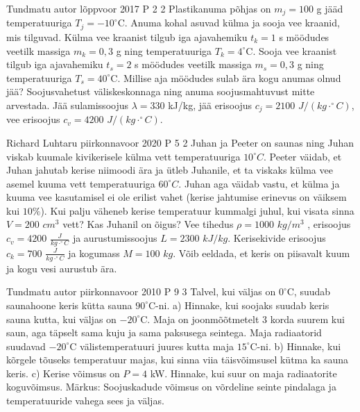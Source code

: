 \documentclass[11pt]{article}
\begin{document}
{%
{Tundmatu autor} %
{lõppvoor} %
{2017} %
{P 2} %
{2} %
{
\ifStatement
Plastikanuma põhjas on $m_j = 100$ g jääd temperatuuriga $T_j = -10 ^{\circ}$C. Anuma kohal asuvad külma ja sooja vee kraanid, mis tilguvad. Külma vee kraanist tilgub iga ajavahemiku $t_k = 1$ s möödudes veetilk massiga $m_k = 0,3$ g ning temperatuuriga $T_k = 4 ^{\circ}$C. Sooja vee kraanist tilgub iga ajavahemiku $t_s = 2$ s möödudes veetilk massiga $m_s = 0,3$ g ning temperatuuriga $T_s = 40^{\circ}$C. Millise aja möödudes sulab ära kogu anumas olnud jää? Soojusvahetust väliskeskonnaga ning anuma soojusmahtuvust mitte arvestada. Jää sulamissoojus $\lambda = 330$ kJ/kg, jää erisoojus $c_j = 2100$ $J/(kg \cdot ^{\circ}C)$, vee erisoojus $c_v = 4200$ $J/(kg \cdot ^{\circ}C)$.
\fi
}

{Richard Luhtaru} %
{piirkonnavoor} %
{2020} %
{P 5} %
{2} %
{
\ifStatement
Juhan ja Peeter on saunas ning Juhan viskab kuumale kivikerisele külma vett temperatuuriga $10^{\circ}C$. Peeter väidab, et Juhan jahutab kerise niimoodi ära ja ütleb Juhanile, et ta viskaks külma vee asemel kuuma vett temperatuuriga $60 ^{\circ}C$. Juhan aga väidab vastu, et külma ja kuuma vee kasutamisel ei ole erilist vahet (kerise jahtumise erinevus on väiksem kui $10\%$). Kui palju väheneb kerise temperatuur kummalgi juhul, kui visata sinna $V = 200$ $cm^3$ vett? Kas Juhanil on õigus? Vee tihedus $\rho = 1000$ $kg/m^3$ , erisoojus $c_v = 4200$  $\frac{J}{kg \cdot ^{\circ}C}$ ja aurustumissoojus $L = 2300$ $kJ/kg$. Kerisekivide erisoojus $c_k = 700$ $\frac{J}{kg \cdot ^{\circ}C}$ ja kogumass $M = 100$ $kg$. Võib eeldada, et keris on piisavalt kuum ja kogu vesi aurustub ära.
\fi
}

{Tundmatu autor} %
{piirkonnavoor} %
{2010} %
{P 9} %
{3} %
{
\ifStatement
Talvel, kui väljas on $0 ^{\circ}$C, suudab saunahoone keris kütta sauna $90^{\circ}$C-ni. 
a) Hinnake, kui soojaks suudab keris sauna kutta, kui väljas on $-20^{\circ}$C.
Maja on joonmõõtmetelt 3 korda suurem kui saun, aga täpselt sama kuju ja sama paksusega seintega. Maja radiaatorid suudavad $-20^{\circ}$C välistemperatuuri juures kutta maja $15^{\circ}$C-ni. 
b) Hinnake, kui kõrgele tõuseks temperatuur majas, kui sinna viia täisvõimsusel kütma ka sauna keris. 
c) Kerise võimsus on $P = 4$ kW. Hinnake, kui suur on maja radiaatorite koguvõimsus. 
Märkus: Soojuskadude võimsus on võrdeline seinte pindalaga ja temperatuuride vahega sees ja väljas.
\fi
}

}
\end{document}
